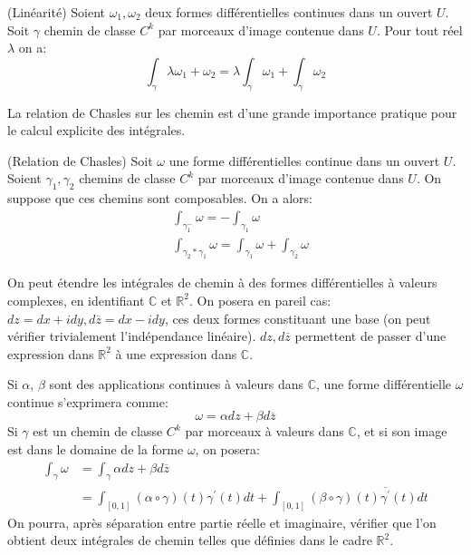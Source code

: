 \begin{fprop}{(Linéarité)}
Soient $\omega_1, \omega_2$ deux formes différentielles continues dans un ouvert
$U$. Soit $\gamma$ chemin de classe $C^k$ par morceaux d'image contenue dans $U$. Pour tout réel
$\lambda$ on a:
\[
\int_\gamma \lambda \omega_1 + \omega_2 = \lambda \int_\gamma \omega_1 +
\int_\gamma \omega_2
\]
\end{fprop}

La relation de Chasles sur les chemin est d'une grande importance pratique pour
le calcul explicite des intégrales.

\begin{fprop}{(Relation de Chasles)}
Soit $\omega$ une forme différentielles continue dans un ouvert
$U$. Soient $\gamma_1,\gamma_2$ chemins de classe $C^k$ par morceaux d'image contenue dans $U$.
On suppose que ces chemins sont composables. On a alors:
\begin{align*}
& \int_{\gamma_1^-} \omega = - \int_{\gamma_1} \omega \\
& \int_{\gamma_2 * \gamma_1} \omega = \int_{\gamma_1} \omega + \int_{\gamma_2}
\omega
\end{align*}
\end{fprop}

On peut étendre les intégrales de chemin à des formes différentielles à valeurs
complexes, en identifiant $\mathbb{C}$ et $\mathbb{R}^2$. On posera en pareil
cas: $dz = dx + i dy, d\overline{z} = dx - i dy$, ces deux formes constituant
une base (on peut vérifier trivialement l'indépendance linéaire). $dz,d\overline{z}$
permettent de passer d'une expression dans $\mathbb{R}^2$ à une expression dans
$\mathbb{C}$.

Si $\alpha$, $\beta$
sont des applications continues à valeurs dans $\mathbb{C}$, 
une forme différentielle $\omega$ continue s'exprimera comme:
\[
\omega = \alpha dz + \beta d\overline{z}
\]
Si $\gamma$ est un chemin de classe $C^k$ par morceaux à valeurs dans $\mathbb{C}$, et si son
image est dans le domaine de la forme $\omega$, on posera:
\begin{align*}
\int_{\gamma} \omega & = \int_{\gamma} \alpha dz + \beta d\overline{z} \\ 
& =\int_{[0,1]} (\alpha \circ \gamma)(t) \gamma^\prime(t)dt + \int_{[0,1]}
(\beta \circ \gamma)(t) \overline{\gamma^\prime}(t)dt
\end{align*}
On pourra, après séparation entre partie réelle et imaginaire, vérifier que
l'on obtient deux intégrales de chemin telles que définies dans le cadre
$\mathbb{R}^2$.
